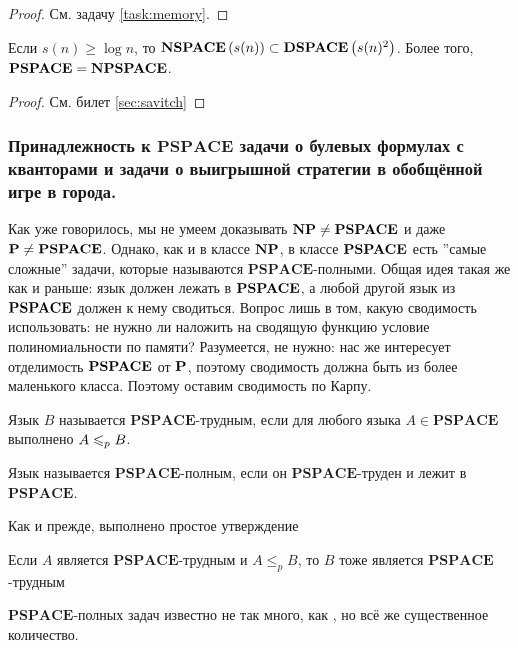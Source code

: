 \begin{proof}
    См. задачу \ref{task:memory}.
\end{proof}

\begin{theorem}[Сэвич] Если $s(n) \ge \log n$, то $\textbf{NSPACE}\left({s(n)}\right) \subset \textbf{DSPACE}\left({s(n)^2}\right)$. Более того, $\textbf{PSPACE} = \textbf{NPSPACE}$.
\end{theorem}

\begin{proof}
    См. билет \ref{sec:savitch}
\end{proof}

\subsubsection{Принадлежность к $\mathbf{PSPACE}$ задачи о булевых формулах с кванторами и задачи
о выигрышной стратегии в обобщённой игре в города.
}

Как уже говорилось, мы не умеем доказывать $\textbf{NP} \neq \textbf{PSPACE}$ и даже
$\textbf{P} \neq \textbf{PSPACE}$. Однако, как и в классе $\textbf{NP}$, в классе $\textbf{PSPACE}$ есть ''самые сложные'' задачи, которые называются $\mathbf{PSPACE}$-полными. Общая идея такая же как и раньше: язык должен лежать в $\textbf{PSPACE}$, а любой другой язык из
$\textbf{PSPACE}$ должен к нему сводиться. Вопрос лишь в том, какую сводимость
использовать: не нужно ли наложить на сводящую функцию условие полиномиальности по памяти? Разумеется, не нужно: нас же интересует отделимость
$\textbf{PSPACE}$ от $\textbf{P}$, поэтому сводимость должна быть из более маленького класса.
Поэтому оставим сводимость по Карпу.

\begin{definition}
    Язык $B$ называется $\mathbf{PSPACE}$-трудным, если для любого языка $A \in \mathbf{PSPACE}$ выполнено $A \leqslant_p B$. 
\end{definition}

\begin{definition}
    Язык называется $\mathbf{PSPACE}$-полным, если он $\mathbf{PSPACE}$-труден и лежит в $\mathbf{PSPACE}$.
\end{definition}

Как и прежде, выполнено простое утверждение

\begin{statement}
Если $A$ является $\mathbf{PSPACE}$-трудным и $A\leqslant_p B$, то $B$ тоже является $\mathbf{PSPACE}$-трудным
\end{statement}

 $\mathbf{PSPACE}$-полных задач известно не так много, как \npc, но всё же существенное количество. 
 
